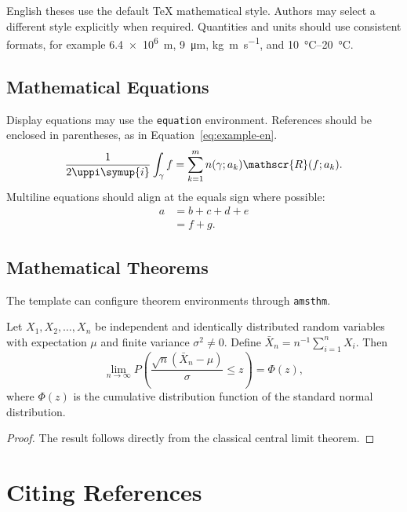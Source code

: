 \documentclass{thuthesis}
\begin{document}
English theses use the default \TeX{} mathematical style. Authors may select a
different style explicitly when required. Quantities and units should use
consistent formats, for example \SI{6.4e6}{m}, \SI{9}{\micro\meter},
\si{kg.m.s^{-1}}, and \SIrange{10}{20}{\degreeCelsius}.

\section{Mathematical Equations}

Display equations may use the \texttt{equation} environment. References should
be enclosed in parentheses, as in Equation~\eqref{eq:example-en}.
\begin{equation}
  \frac{1}{2\uppi\symup{i}}\int_\gamma f
  =\sum_{k=1}^m n(\gamma;a_k)\mathscr{R}(f;a_k).
  \label{eq:example-en}
\end{equation}
Multiline equations should align at the equals sign where possible:
\begin{align}
  a &= b+c+d+e \\
  &= f+g.
\end{align}

\section{Mathematical Theorems}

The template can configure theorem environments through \texttt{amsthm}.
\begin{theorem}
  Let $X_1,X_2,\dots,X_n$ be independent and identically distributed random
  variables with expectation $\mu$ and finite variance $\sigma^2\ne0$. Define
  $\bar X_n=n^{-1}\sum_{i=1}^n X_i$. Then
  \begin{equation}
    \lim_{n\to\infty}P\left(\frac{\sqrt n(\bar X_n-\mu)}{\sigma}\le
    z\right)=\Phi(z),
  \end{equation}
  where $\Phi(z)$ is the cumulative distribution function of the standard normal
  distribution.
\end{theorem}
\begin{proof}
  The result follows directly from the classical central limit theorem.
\end{proof}

\chapter{Citing References}
\end{document}
